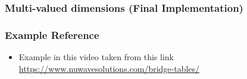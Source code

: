 \begin{frame}
\frametitle{Multi-valued dimensions (Final Implementation)}

\begin{table}
	\caption{Expected output of ArticleSales}
\end{table}

\end{frame}
\begin{frame}
\frametitle{Example Reference}
	\begin{itemize}[<+->]
		\item Example in this video taken from this link \href{https://www.nuwavesolutions.com/bridge-tables/}{https://www.nuwavesolutions.com/bridge-tables/}
	\end{itemize}
\end{frame}

